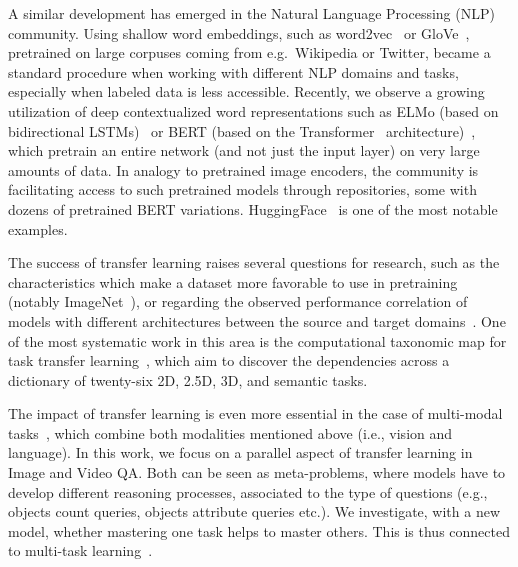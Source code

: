 A similar development has emerged in the Natural Language Processing (NLP) community.
Using shallow word embeddings, such as word2vec~\cite{mikolov2013distributed} or GloVe~\cite{pennington2014glove}, pretrained on large corpuses coming from e.g.\ Wikipedia or Twitter, became a standard procedure when working with different NLP domains and tasks, especially when labeled data is less accessible.
Recently, we observe a growing utilization of deep contextualized word representations such as ELMo (based on bidirectional LSTMs)~\cite{peters2018deep} or BERT (based on the Transformer~\cite{vaswani2017attention} architecture)~\cite{devlin2018bert}, which pretrain an entire network (and not just the input layer) on very large amounts of data.
In analogy to pretrained image encoders, the community is facilitating access to such pretrained models through repositories, some with dozens of pretrained BERT variations. HuggingFace~\cite{wolf2019transformers} is one of the most notable examples.

The success of transfer learning raises several questions for research, such as the characteristics which make a dataset more favorable to use in pretraining (notably ImageNet~\cite{huh2016makes}), or regarding the observed performance correlation of models with different architectures between the source and target domains~\cite{kornblith2019better}.
One of the most systematic work in this area is the computational taxonomic map for task transfer learning~\cite{zamir2018taskonomy}, which aim to discover the dependencies across a dictionary of twenty-six 2D, 2.5D, 3D, and semantic tasks.

The impact of transfer learning is even more essential in the case of multi-modal tasks~\cite{mogadala2019trends}, which combine both modalities mentioned above (i.e., vision and language).
In this work, we focus on a parallel aspect of transfer learning in Image and Video QA. Both can be seen as meta-problems, where models have to develop different reasoning processes, associated to the type of questions (e.g., objects count queries, objects attribute queries etc.). We investigate, with a new model, whether mastering one task helps to master others. This is thus connected to multi-task learning~\cite{caruana1997multitask}.


